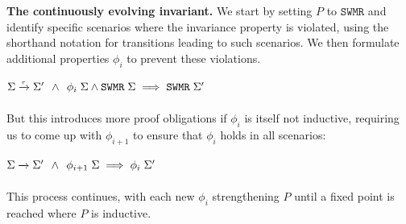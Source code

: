\documentclass[10pt,conference]{IEEEtran}
\newcommand{\StateSymbol}{\Sigma}
\newcommand{\makestep}[2]{%
  \xrightarrow[%
    {\mathclap{\scriptscriptstyle
      \ifstrempty{#2}{}{#2}
    }}%
  ]{%
    {\mathclap{\scriptscriptstyle
      \ifstrempty{#1}{}{#1}
    }}%
  }%
}
\newcommand\SWMR{\texttt{SWMR}}
\begin{document}
\medskip
\noindent
\textbf{The continuously evolving invariant.}
We start by setting $P$ to $\SWMR$ and identify specific scenarios where the invariance property
\smash{$P \; \StateSymbol{} \land \StateSymbol{} \makestep{}{} \StateSymbol{}' \implies P \; \StateSymbol{}'$} is violated, using the shorthand notation \smash{$\makestep{\tau}{}$} for transitions leading to such scenarios. We then formulate additional properties $\phi_i$ to prevent these violations.
\begin{center}
$\StateSymbol{} \makestep{\tau}{} \StateSymbol{}' \;\, \land \;\,\phi_i \; \StateSymbol{}  \land \SWMR\; \StateSymbol{} \implies \SWMR \;\StateSymbol{}'$
\end{center}
\noindent
But this introduces more proof obligations if $\phi_i$ is itself not inductive, requiring us to come up with $\phi_{i+1}$ to ensure that $\phi_i$ holds in all scenarios:
\begin{center}
$\StateSymbol{} \makestep{}{} \StateSymbol{}' \;\, \land \;\,\phi_{i+1} \; \StateSymbol{} \implies \phi_i \;\StateSymbol{}'$
\end{center}
\noindent
This process continues, with each new $\phi_i$ strengthening $P$ until a fixed point is reached where $P$ is inductive.
\end{document}
